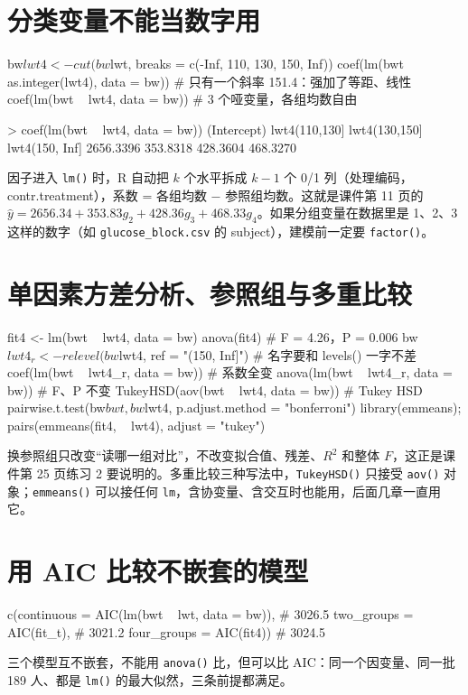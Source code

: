 \section{分类变量不能当数字用}
\begin{rcode}[R · 四组：编成 1/2/3/4 与哑变量的区别]
bw$lwt4 <- cut(bw$lwt, breaks = c(-Inf, 110, 130, 150, Inf))
coef(lm(bwt ~ as.integer(lwt4), data = bw))   # 只有一个斜率 151.4：强加了等距、线性
coef(lm(bwt ~ lwt4, data = bw))               # 3 个哑变量，各组均数自由
\end{rcode}
\begin{routput}
> coef(lm(bwt ~ lwt4, data = bw))
   (Intercept)  lwt4(110,130]  lwt4(130,150] lwt4(150, Inf]
     2656.3396       353.8318       428.3604       468.3270
\end{routput}
因子进入 \Verb|lm()| 时，R 自动把 $k$ 个水平拆成 $k-1$ 个 0/1 列（处理编码，contr.treatment），系数 = 各组均数 − 参照组均数。这就是课件第 11 页的 $\hat y=2656.34+353.83g_2+428.36g_3+468.33g_4$。如果分组变量在数据里是 1、2、3 这样的数字（如 \Verb|glucose_block.csv| 的 subject），建模前一定要 \Verb|factor()|。

\section{单因素方差分析、参照组与多重比较}
\begin{rcode}
fit4 <- lm(bwt ~ lwt4, data = bw)
anova(fit4)                                       # F = 4.26，P = 0.006
bw$lwt4_r <- relevel(bw$lwt4, ref = "(150, Inf]") # 名字要和 levels() 一字不差
coef(lm(bwt ~ lwt4_r, data = bw))                 # 系数全变
anova(lm(bwt ~ lwt4_r, data = bw))                # F、P 不变
TukeyHSD(aov(bwt ~ lwt4, data = bw))              # Tukey HSD
pairwise.t.test(bw$bwt, bw$lwt4, p.adjust.method = "bonferroni")
library(emmeans); pairs(emmeans(fit4, ~ lwt4), adjust = "tukey")
\end{rcode}
换参照组只改变“读哪一组对比”，不改变拟合值、残差、$R^2$ 和整体 $F$，这正是课件第 25 页练习 2 要说明的。多重比较三种写法中，\Verb|TukeyHSD()| 只接受 \Verb|aov()| 对象；\Verb|emmeans()| 可以接任何 \Verb|lm|，含协变量、含交互时也能用，后面几章一直用它。

\section{用 AIC 比较不嵌套的模型}
\begin{rcode}[R · 连续、二分、四分]
c(continuous  = AIC(lm(bwt ~ lwt, data = bw)),    # 3026.5
  two_groups  = AIC(fit_t),                        # 3021.2
  four_groups = AIC(fit4))                         # 3024.5
\end{rcode}
三个模型互不嵌套，不能用 \Verb|anova()| 比，但可以比 AIC：同一个因变量、同一批 189 人、都是 \Verb|lm()| 的最大似然，三条前提都满足。

